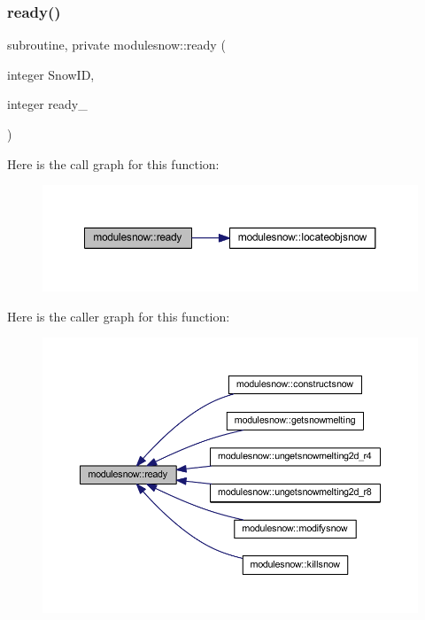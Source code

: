 \subsubsection{\texorpdfstring{ready()}{ready()}}
{\footnotesize\ttfamily subroutine, private modulesnow\+::ready (\begin{DoxyParamCaption}\item[{integer}]{Snow\+ID,  }\item[{integer}]{ready\+\_\+ }\end{DoxyParamCaption})\hspace{0.3cm}{\ttfamily [private]}}

Here is the call graph for this function\+:\nopagebreak
\begin{figure}[H]
\begin{center}
\leavevmode
\includegraphics[width=350pt]{namespacemodulesnow_a63b7009f3649ad5fe78d70607da94054_cgraph}
\end{center}
\end{figure}
Here is the caller graph for this function\+:\nopagebreak
\begin{figure}[H]
\begin{center}
\leavevmode
\includegraphics[width=350pt]{namespacemodulesnow_a63b7009f3649ad5fe78d70607da94054_icgraph}
\end{center}
\end{figure}
\mbox{\label{namespacemodulesnow_ab811c0f4d09e6ff82a7c0bc8b88a1503}} 
